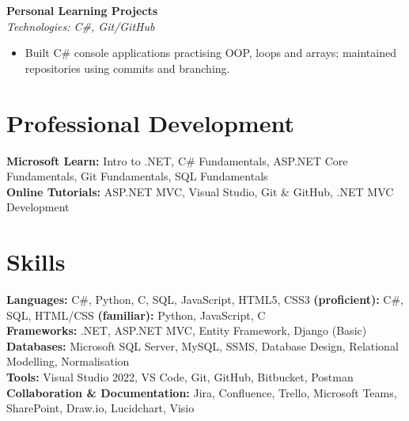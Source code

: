 \documentclass[10.5pt]{article}
\newcommand{\itemlist}[1]{\begin{itemize}[leftmargin=1.4em,itemsep=0pt,topsep=1pt,parsep=0pt]#1\end{itemize}}
\begin{document}
\textbf{Personal Learning Projects} \\
\textit{Technologies: C\#, Git/GitHub}
\itemlist{
\item Built C\# console applications practising OOP, loops and arrays; maintained repositories using commits and branching.
}

\section{Professional Development}
\textbf{Microsoft Learn:} Intro to .NET, C\# Fundamentals, ASP.NET Core Fundamentals, Git Fundamentals, SQL Fundamentals \\
\textbf{Online Tutorials:} ASP.NET MVC, Visual Studio, Git \& GitHub, .NET MVC Development

\section{Skills}
\textbf{Languages:} C\#, Python, C, SQL, JavaScript, HTML5, CSS3 \hfill \textbf{(proficient):} C\#, SQL, HTML/CSS \quad \textbf{(familiar):} Python, JavaScript, C\\
\textbf{Frameworks:} .NET, ASP.NET MVC, Entity Framework, Django (Basic) \\
\textbf{Databases:} Microsoft SQL Server, MySQL, SSMS, Database Design, Relational Modelling, Normalisation \\
\textbf{Tools:} Visual Studio 2022, VS Code, Git, GitHub, Bitbucket, Postman \\
\textbf{Collaboration \& Documentation:} Jira, Confluence, Trello, Microsoft Teams, SharePoint, Draw.io, Lucidchart, Visio
\end{document}
